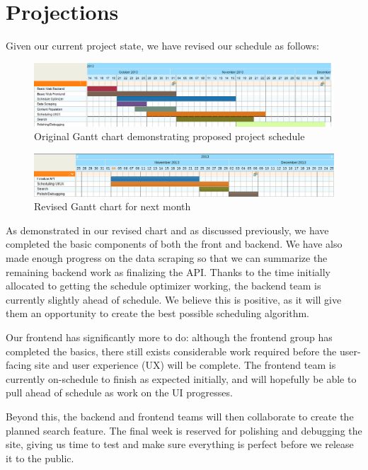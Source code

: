 \section{Projections}
Given our current project state, we have revised our schedule as follows:
\begin{figure}[h!]
  \centering
  \includegraphics[width=\textwidth]{gantt.png}
  \caption{Original Gantt chart demonstrating proposed project schedule}
\end{figure}
\begin{figure}[h!]
  \centering
  \includegraphics[width=\textwidth]{revised-gantt.png}
  \caption{Revised Gantt chart for next month}
\end{figure}

As demonstrated in our revised chart and as discussed previously, we have
completed the basic components of both the front and backend. We have also
made enough progress on the data scraping so that we can summarize the
remaining backend work as finalizing the API. Thanks to the time initially
allocated to getting the schedule optimizer working, the backend team is
currently slightly ahead of schedule. We believe this is positive, as it will
give them an opportunity to create the best possible scheduling algorithm.

Our frontend has significantly more to do: although the frontend group
has completed the basics, there still exists considerable work required
before the user-facing site and user experience (UX) will be complete.
The frontend team is currently on-schedule to finish as expected initially,
and will hopefully be able to pull ahead of schedule as work on the UI
progresses.

Beyond this, the backend and frontend teams will then collaborate to create
the planned search feature. The final week is reserved for polishing and
debugging the site, giving us time to test and make sure everything is perfect
before we release it to the public.
